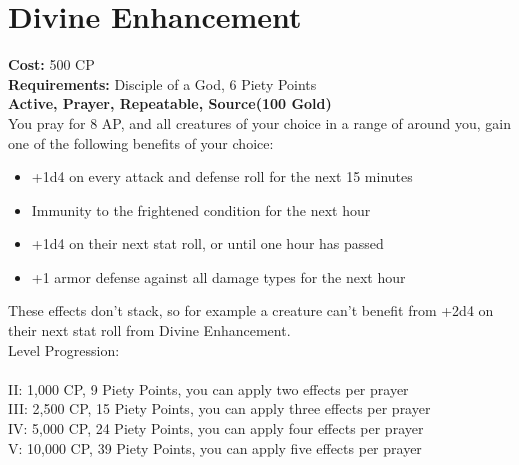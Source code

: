 \section{Divine Enhancement}\label{prayer:divineEnhancement}
\textbf{Cost:} 500 CP\\
\textbf{Requirements:} Disciple of a God, 6 Piety Points \\
\textbf{Active, Prayer, Repeatable, Source(100 Gold)}\\
You pray for 8 AP, and all creatures of your choice in a range of  around you, gain one of the following benefits of your choice:
\begin{itemize}
	\item +1d4 on every attack and defense roll for the next 15 minutes
	\item Immunity to the frightened condition for the next hour
	\item +1d4 on their next stat roll, or until one hour has passed
	\item +1 armor defense against all damage types for the next hour
\end{itemize}

These effects don't stack, so for example a creature can't benefit from +2d4 on their next stat roll from Divine Enhancement.\\

Level Progression:\\
\\
II: 1,000 CP, 9 Piety Points, you can apply two effects per prayer\\
III: 2,500 CP, 15 Piety Points, you can apply three effects per prayer\\
IV: 5,000 CP, 24 Piety Points, you can apply four effects per prayer\\
V: 10,000 CP, 39 Piety Points, you can apply five effects per prayer\\